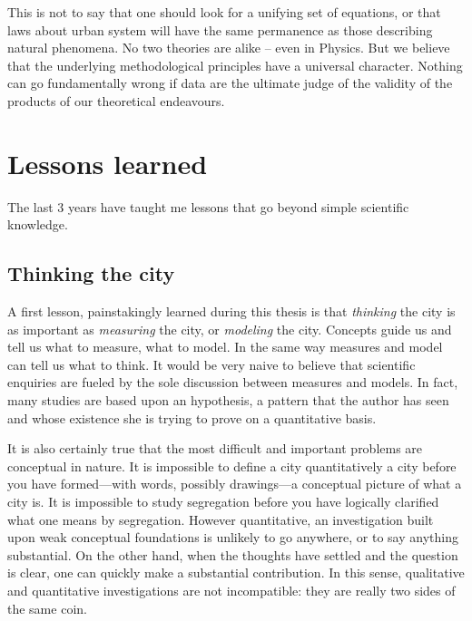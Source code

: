 This is not to say that one should look for a unifying set of equations, or that
laws about urban system will have the same permanence as those describing
natural phenomena. No two theories are alike -- even in Physics. But we believe
that the underlying methodological principles have a universal character.
Nothing can go fundamentally wrong if data are the ultimate judge of the
validity of the products of our theoretical endeavours.



\section{Lessons learned}
\label{sec:what_the_past_3_years_have_brought}

The last $3$ years have taught me lessons that go beyond simple scientific
knowledge.

\subsection{Thinking the city}
\label{sub:thinking_the_city}

A first lesson, painstakingly learned during this thesis is that \emph{thinking} the
city is as important as \emph{measuring} the city, or \emph{modeling} the city.
Concepts guide us and tell us what to measure, what to model. In the same way
measures and model can tell us what to think. It would be very naive to
believe that scientific enquiries are fueled by the sole discussion between
measures and models. In fact, many studies are based upon an hypothesis, a
pattern that the author has seen and whose existence she is trying to prove on a
quantitative basis. 

It is also certainly true that the most difficult and important problems are
conceptual in nature.  It is impossible to define a city quantitatively a city
before you have formed---with words, possibly drawings---a conceptual picture of
what a city is.  It is impossible to study segregation before you have logically
clarified what one means by segregation. However quantitative, an investigation
built upon weak conceptual foundations is unlikely to go anywhere, or to say
anything substantial. On the other hand, when the thoughts have settled and the
question is clear, one can quickly make a substantial contribution. In this
sense, qualitative and quantitative investigations are not incompatible: they
are really two sides of the same coin.\\


